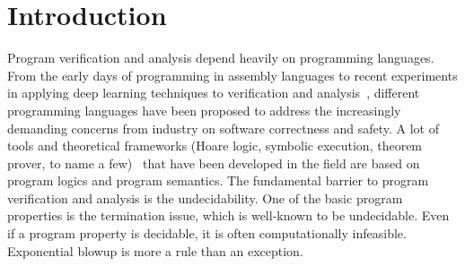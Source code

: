 \documentclass[runningheads]{llncs}
\begin{document}
\def\typeIterInt{\mathtt{iint}}
\def\opSize{\mathtt{size}}
\def\funSize#1{\mathrm{size}(#1)}
\def\funAbs#1{\mathrm{abs}(#1)}
\def\t{\texttt{\#}\mathtt{t}}
\def\f{\texttt{\#}\mathtt{f}}
\def\True{\texttt{true}}
\def\False{\texttt{false}}
\def\A{\mathcal{A}}
\def\P{\mathsf{P}}
\def\c{\mathtt{c}}
\def\D{\mathsf{D}}
\def\p{\mathsf{p}}
\def\S{\mathsf{S}}
\def\E{\mathsf{E}}
\def\e{\mathsf{e}}
\def\s{\mathsf{s}}
\def\Z{\mathbb{Z}}
\def\B{\mathbb{B}}
\def\V{\mathbb{V}}
\def\C{\mathsf{C}}
\def\tt{\mathsf{t}}
\def\smap#1#2{\llbracket#1\rrbracket_{#2}}
\def\O{\mathsf{O}}
\def\op{\mathtt{op}}
\def\arity{\mathrm{ary}}
\def\L{\mathsf{L}}
\def\T{\mathsf{T}}
\def\dom{\mathrm{dom}}
\def\Int{\mathsf{Int}}
\def\Bool{\mathsf{Bool}}
\def\semantics#1#2#3{\langle#1,#2\rangle\Downarrow{#3}}
\def\cost#1#2#3#4{\langle#1,#2\rangle\Downarrow_{#4}{#3}}
\def\srule#1#2#3{\frac{#1}{#2}[\Sigma\mathtt{-#3}]}
\def\sref#1{$\Sigma\mathtt{-#1}$}
\def\evalTree#1#2{\mathscr{E}_{\;#1,\,#2}}
\def\tmap#1#2{\{\!|#1|\!\}_{#2}}
\def\l{\ell}
\def\assignable{\mathsf{Asg}}
\def\comparable{{\sim_{\,\T}\;}}
\def\notcmp{\not\sim_{\,\T}\;}
\def\typing#1#2#3#4{#1,#2\vdash#3:#4}
\def\trule#1#2#3{\frac{#1}{#2}[\Gamma\mathtt{-#3}]}
\def\tref#1{$\Gamma\mathtt{-#1}$}
\def\domi#1{\dom_{\mathrm{\,I}}(#1)}
\def\restr#1#2{{(#1)_{\restriction #2}}}
\def\classF{\mathscr{F}}
\def\ic{\mathrm{ic}}
\def\polyn{\mathtt{poly}(n)}
\def\I{\mathscr{I}}
\def\N{\mathbb{N}} %
\section{Introduction}\label{sec:introduction}

Program verification and analysis depend heavily on programming languages.
From the early days of programming in assembly languages to recent experiments in applying deep learning techniques to verification and analysis~\cite{si2020code2inv}, different programming languages have been proposed to address the increasingly demanding concerns from industry on software correctness and safety.
A lot of tools and theoretical frameworks (Hoare logic, symbolic execution, theorem prover, to name a few)~\cite{baier2008principles,ali2017survey,moura2021lean,bertot2013interactive} that have been developed in the field are based on program logics and program semantics.
The fundamental barrier to program verification and analysis is the undecidability.
One of the basic program properties is the termination issue, which is well-known to be undecidable.
Even if a program property is decidable, it is often computationally infeasible.
Exponential blowup is more a rule than an exception.
\end{document}
